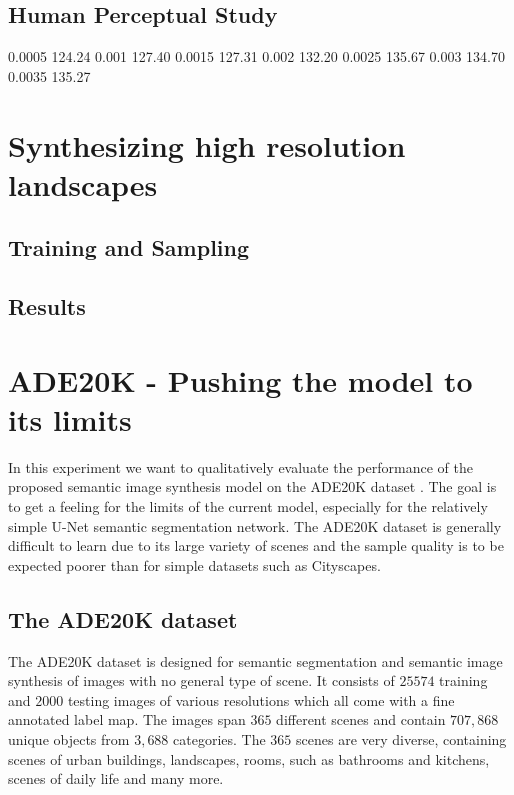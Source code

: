 \subsection{Human Perceptual Study}

0.0005 124.24
0.001  127.40
0.0015 127.31
0.002 132.20
0.0025 135.67
0.003 134.70
0.0035 135.27


\section[Synthesizing high resolution landscapes]{Synthesizing high resolution landscapes%
    } \label{sec:5.5}

\subsection{Training and Sampling}
\subsection{Results}

\section[ADE20K - Pushing the model to its limits]{ADE20K - Pushing the model to its limits%
    } \label{sec:5.6}
In this experiment we want to qualitatively evaluate the performance of the proposed semantic image synthesis model on the ADE20K dataset \cite{ade20k}. The goal is to get a feeling for the limits of the current model, especially for the relatively simple U-Net semantic segmentation network. The ADE20K dataset is generally difficult to learn due to its large variety of scenes and the sample quality is to be expected poorer than for simple datasets such as Cityscapes. 
\subsection{The ADE20K dataset}
The ADE20K dataset \cite{ade20k}  is designed for semantic segmentation and semantic image synthesis of images with no general type of scene. It consists of $25574$ training and $2000$ testing images of various resolutions which all come with a fine annotated label map. The images span $365$ different scenes and contain $707{,}868$ unique objects from $3{,}688$ categories. The $365$ scenes are very diverse, containing scenes of urban buildings, landscapes, rooms, such as bathrooms and kitchens, scenes of daily life and many more. 
